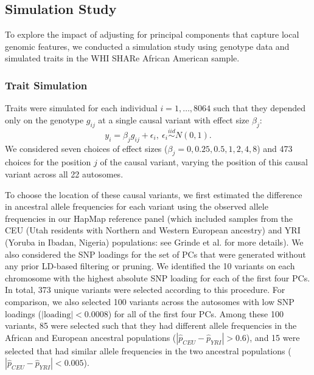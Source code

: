 \documentclass[12pt]{article}
\newcommand{\add}[1]{{\color{red}{[... #1 ...]}}}
\begin{document}
\subsection{Simulation Study}

To explore the impact of adjusting for principal components that capture local genomic features, we conducted a simulation study using genotype data and simulated traits in the WHI SHARe African American sample.

\subsubsection{Trait Simulation}

Traits were simulated for each individual $i = 1, \dots, 8064$ such that they depended only on the genotype $g_{ij}$ at a single causal variant with effect size $\beta_j$: $$y_i = \beta_j g_{ij} + \epsilon_i, \ \epsilon_i \stackrel{iid}{\sim} N(0, 1).$$
We considered seven choices of effect sizes ($\beta_j = 0, 0.25, 0.5, 1, 2, 4, 8$) and 473 choices for the position $j$ of the causal variant, varying the position of this causal variant across all 22 autosomes.

To choose the location of these causal variants, we first estimated the difference in ancestral allele frequencies for each variant using the observed allele frequencies in our HapMap reference panel (which included samples from the CEU (Utah residents with Northern and Western European ancestry) and YRI (Yoruba in Ibadan, Nigeria)  populations: see Grinde et al. \citep{steam} for more details).
We also considered the SNP loadings %
for the set of PCs that were generated without any prior LD-based filtering or pruning.
We identified the 10 variants on each chromosome with the highest absolute SNP loading for each of the first four PCs. 
In total, 373 unique variants were selected according to 	this procedure. 
For comparison, we also selected 100 variants across the autosomes with low SNP loadings ($|\text{loading}| < 0.0008$) for all of the first four PCs.
Among these 100 variants, 85 were selected such that they had different allele frequencies in the African and European ancestral populations ($|\hat{p}_{CEU} - \hat{p}_{YRI}| > 0.6$), and 15 were selected that had similar allele frequencies in the two ancestral populations ($|\hat{p}_{CEU} - \hat{p}_{YRI}| < 0.005$).
\end{document}
